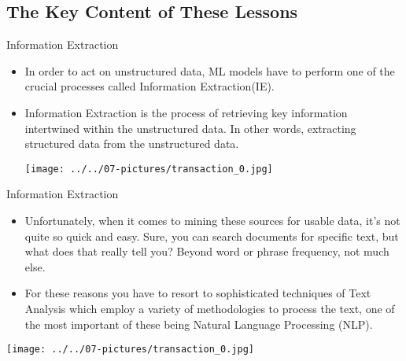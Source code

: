 \documentclass[11pt]{beamer}
\begin{document}
\subsection{The Key Content of These Lessons}
%
\begin{frame}{Information Extraction}
\begin{itemize}
\item In order to act on unstructured data, ML models have to perform one of the crucial processes called Information Extraction(IE). 

\item Information Extraction is the process of retrieving key information intertwined within the unstructured data. In other words, extracting structured data from the unstructured data. 
\vspace{0.5cm}
\begin{center}
\texttt{[image: ../../07-pictures/transaction\_0.jpg]} 
\end{center}

\end{itemize}
\end{frame}
\begin{frame}{Information Extraction}
\begin{itemize}
\item Unfortunately, when it comes to mining these sources for usable data, it’s not quite so quick and easy. Sure, you can search documents for specific text, but what does that really tell you? Beyond word or phrase frequency, not much else. 

\item For these reasons you have to resort to sophisticated techniques of Text Analysis which employ a variety of methodologies to process the text, one of the most important of these being Natural Language Processing (NLP).
\end{itemize}

\begin{center}
\texttt{[image: ../../07-pictures/transaction\_0.jpg]} 
\end{center}

\end{frame}
\end{document}
